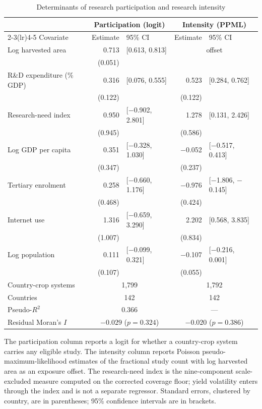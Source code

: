 \begin{table}[!t]
\centering
\caption{Determinants of research participation and research intensity}
\label{tab:reg}
\begin{tabular*}{\textwidth}{@{\extracolsep\fill}l r@{\hspace{6pt}}l r@{\hspace{6pt}}l@{}}
\toprule
& \multicolumn{2}{c}{Participation (logit)} & \multicolumn{2}{c}{Intensity (PPML)} \\
\cmidrule(lr){2-3}\cmidrule(lr){4-5}
Covariate & Estimate & 95\% CI & Estimate & 95\% CI \\
\midrule
Log harvested area & 0.713 & [0.613, 0.813] & \multicolumn{2}{c}{offset} \\
 & (0.051) & &  & \\
R\&D expenditure (\% GDP) & 0.316 & [0.076, 0.555] & 0.523 & [0.284, 0.762] \\
 & (0.122) & & (0.122) & \\
Research-need index & 0.950 & [$-$0.902, 2.801] & 1.278 & [0.131, 2.426] \\
 & (0.945) & & (0.586) & \\
Log GDP per capita & 0.351 & [$-$0.328, 1.030] & $-$0.052 & [$-$0.517, 0.413] \\
 & (0.347) & & (0.237) & \\
Tertiary enrolment & 0.258 & [$-$0.660, 1.176] & $-$0.976 & [$-$1.806, $-$0.145] \\
 & (0.468) & & (0.424) & \\
Internet use & 1.316 & [$-$0.659, 3.290] & 2.202 & [0.568, 3.835] \\
 & (1.007) & & (0.834) & \\
Log population & 0.111 & [$-$0.099, 0.321] & $-$0.107 & [$-$0.216, 0.001] \\
 & (0.107) & & (0.055) & \\
\midrule
Country-crop systems & \multicolumn{2}{c}{1,799} & \multicolumn{2}{c}{1,792} \\
Countries & \multicolumn{2}{c}{142} & \multicolumn{2}{c}{142} \\
Pseudo-$R^{2}$ & \multicolumn{2}{c}{0.366} & \multicolumn{2}{c}{---} \\
Residual Moran's $I$ & \multicolumn{2}{c}{$-0.029$ ($p=0.324$)} & \multicolumn{2}{c}{$-0.020$ ($p=0.386$)} \\
\bottomrule
\end{tabular*}
\begin{tablenotes}
\item[] The participation column reports a logit for whether a country-crop system carries any eligible study. The intensity column reports Poisson pseudo-maximum-likelihood estimates of the fractional study count with log harvested area as an exposure offset. The research-need index is the nine-component scale-excluded measure computed on the corrected coverage floor; yield volatility enters through the index and is not a separate regressor. Standard errors, clustered by country, are in parentheses; 95\% confidence intervals are in brackets.
\end{tablenotes}
\end{table}
